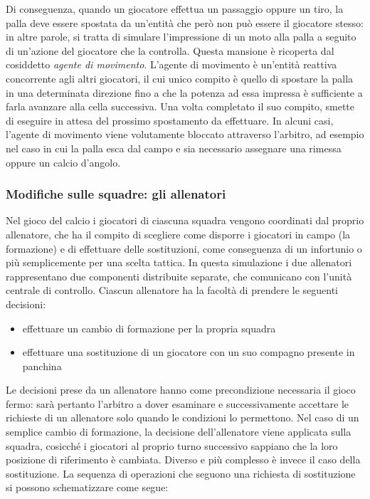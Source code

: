 Di conseguenza, quando un giocatore effettua un passaggio oppure un tiro, la palla deve essere spostata da un'entità che però non può essere il giocatore stesso: in altre parole, si tratta di simulare l'impressione di un moto alla palla a seguito di un'azione del giocatore che la controlla. Questa mansione è ricoperta dal cosiddetto \textit{agente di movimento}. L'agente di movimento è un'entità reattiva concorrente agli altri giocatori, il cui unico compito è quello di spostare la palla in una determinata direzione fino a che la potenza ad essa impressa è sufficiente a farla avanzare alla cella successiva. Una volta completato il suo compito, smette di eseguire in attesa del prossimo spostamento da effettuare. In alcuni casi, l'agente di movimento viene volutamente bloccato attraverso l'arbitro, ad esempio nel caso in cui la palla esca dal campo e sia necessario assegnare una rimessa oppure un calcio d'angolo.

\subsubsection{Modifiche sulle squadre: gli allenatori}
\label{sec:modello_squadre_allenatori}


Nel gioco del calcio i giocatori di ciascuna squadra vengono coordinati dal proprio allenatore, che ha il compito di scegliere come disporre i giocatori in campo (la formazione) e di effettuare delle sostituzioni, come conseguenza di un infortunio o più semplicemente per una scelta tattica. In questa simulazione i due allenatori rappresentano due componenti distribuite separate, che comunicano con l'unità centrale di controllo. Ciascun allenatore ha la facoltà di prendere le seguenti decisioni:

\begin{itemize}
	\item effettuare un cambio di formazione per la propria squadra
	\item effettuare una sostituzione di un giocatore con un suo compagno presente in panchina
\end{itemize}

Le decisioni prese da un allenatore hanno come precondizione necessaria il gioco fermo: sarà pertanto l'arbitro a dover esaminare e successivamente accettare le richieste di un allenatore solo quando le condizioni lo permettono. Nel caso di un semplice cambio di formazione, la decisione dell'allenatore viene applicata sulla squadra, cosicché i giocatori al proprio turno successivo sappiano che la loro posizione di riferimento è cambiata. Diverso e più complesso è invece il caso della sostituzione. La sequenza di operazioni che seguono una richiesta di sostituzione si possono schematizzare come segue:

